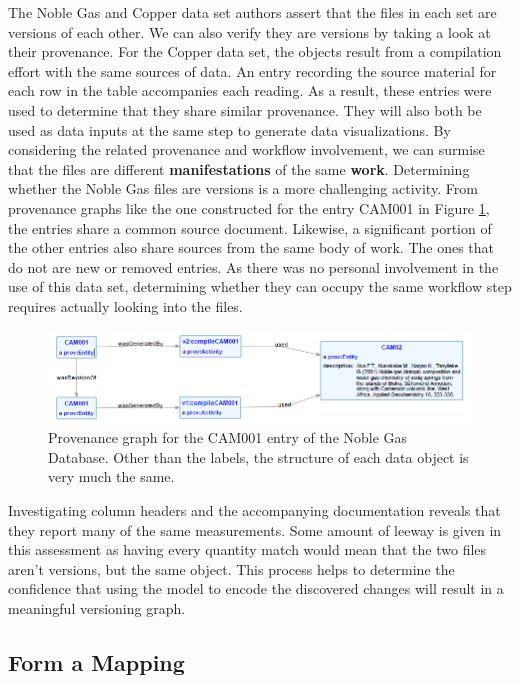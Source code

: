 The Noble Gas and Copper data set authors assert that the files in each set are versions of each other.
We can also verify they are versions by taking a look at their provenance.
For the Copper data set, the objects result from a compilation effort with the same sources of data.
An entry recording the source material for each row in the table accompanies each reading.
As a result, these entries were used to determine that they share similar provenance.
They will also both be used as data inputs at the same step to generate data visualizations.
By considering the related provenance and workflow involvement, we can surmise that the files are different \textbf{manifestations} of the same \textbf{work}.
Determining whether the Noble Gas files are versions is a more challenging activity.
From provenance graphs like the one constructed for the entry CAM001 in Figure \ref{CAM001ProvGraph}, the entries share a common source document.
Likewise, a significant portion of the other entries also share sources from the same body of work.
The ones that do not are new or removed entries.
As there was no personal involvement in the use of this data set, determining whether they can occupy the same workflow step requires actually looking into the files.
\begin{figure}
	\centering
	\includegraphics[scale=0.70]{figures/CAM001v1v2.png}
	\caption{Provenance graph for the CAM001 entry of the Noble Gas Database.  Other than the labels, the structure of each data object is very much the same.}
	\label{CAM001ProvGraph}
\end{figure}
Investigating column headers and the accompanying documentation reveals that they report many of the same measurements.
Some amount of leeway is given in this assessment as having every quantity match would mean that the two files aren't versions, but the same object.
This process helps to determine the confidence that using the model to encode the discovered changes will result in a meaningful versioning graph.


\subsection{Form a Mapping} \label{mapping}

